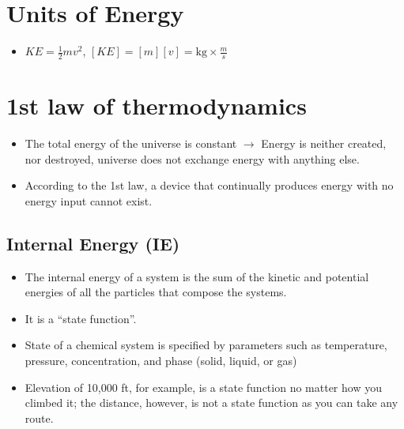 \documentclass[
	chapter=6,
	title={Thermochemistry},
	showanswers=true,
]{chem122notes}
\begin{document}
\section{Units of Energy}\label{sec:units-of-energy}
\begin{itemize}
	\item $KE = \frac{1}{2}mv^{2}$, $[KE] = [m][v] = \mbox{kg}\times \frac{m}{s}$
\end{itemize}

\section{1st law of thermodynamics}\label{sec:sec:1st-law-of-thermodynamics}
\begin{itemize}
	\item The total energy of the universe is constant $\rightarrow$ Energy is neither created, nor destroyed, universe does not exchange energy with anything else.
	\item According to the 1st law, a device that continually produces energy with no energy input cannot exist.
\end{itemize}

\subsection{Internal Energy (IE)}\label{subsec:internal-energy-(ie)}
\begin{itemize}
	\item The internal energy of a system is the sum of the kinetic and potential energies of all the particles that compose the systems.
	\item It is a ``state function''.
	\item State of a chemical system is specified by parameters such as temperature, pressure, concentration, and phase (solid, liquid, or gas)
	\item Elevation of 10,000 ft, for example, is a state function no matter how you climbed it;
	the distance, however, is not a state function as you can take any route.
\end{itemize}

\end{document}
